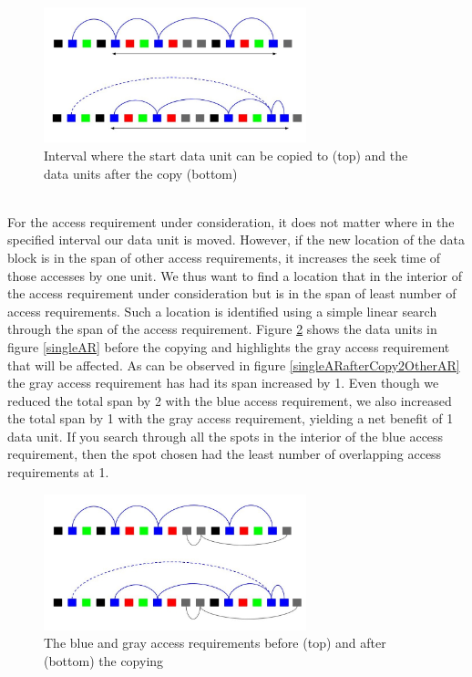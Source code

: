 \documentclass[conference]{acmsiggraph}
\begin{document}
\begin{figure}[ht]
\centering
\includegraphics[width=3in]{SingleAR_afterCopy.jpg}
\caption{Interval where the start data unit can be copied to (top) and the data units after the copy (bottom)}
\label{singleARafterCopy}
\end{figure}
\\
For the access requirement under consideration, it does not matter where in the specified interval our data unit is moved. However, if the new location of the data block is in the span of other access requirements, it increases the seek time of those accesses by one unit. We thus want to find a location that in the interior of the access requirement under consideration but is in the span of least number of access requirements. Such a location is identified using a simple linear search through the span of the access requirement. Figure \ref{singleARafterCopyOtherAR} shows the data units in figure \ref{singleAR} before the copying and highlights the gray access requirement that will be affected. As can be observed in figure \ref{singleARafterCopy2OtherAR} the gray access requirement has had its span increased by 1. Even though we reduced the total span by 2 with the blue access requirement, we also increased the total span by 1 with the gray access requirement, yielding a net benefit of 1 data unit. If you search through all the spots in the interior of the blue access requirement, then the spot chosen had the least number of overlapping access requirements at 1.\\

\begin{figure}[ht]
\centering
\includegraphics[width=3in]{SingleAR_afterCopy_otherARnoted.jpg}
\caption{The blue and gray access requirements before (top) and after (bottom) the copying}
\label{singleARafterCopyOtherAR}
\end{figure}
\end{document}
